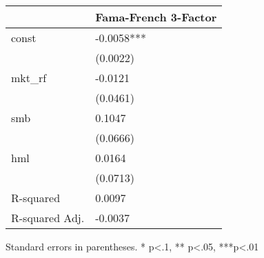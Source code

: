 \begin{table}
\caption{}
\label{}
\begin{center}
\begin{tabular}{ll}
\hline
               & Fama-French 3-Factor  \\
\hline
const          & -0.0058***            \\
               & (0.0022)              \\
mkt\_rf        & -0.0121               \\
               & (0.0461)              \\
smb            & 0.1047                \\
               & (0.0666)              \\
hml            & 0.0164                \\
               & (0.0713)              \\
R-squared      & 0.0097                \\
R-squared Adj. & -0.0037               \\
\hline
\end{tabular}
\end{center}
\end{table}
\bigskip
Standard errors in parentheses. \newline 
* p<.1, ** p<.05, ***p<.01